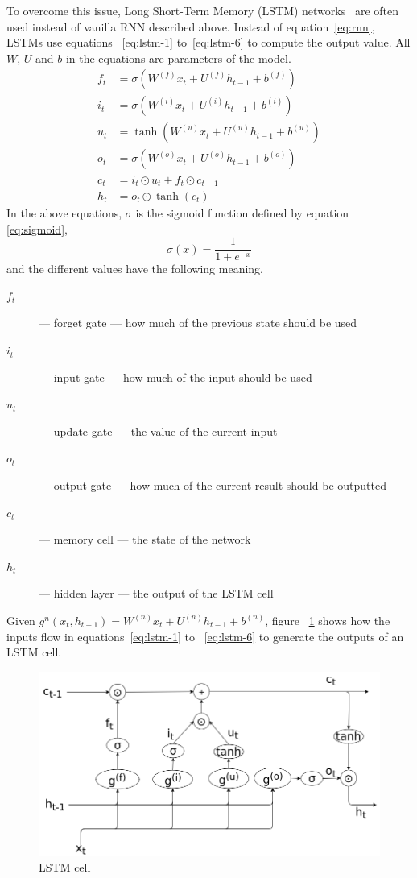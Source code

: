 To overcome this issue, Long Short-Term Memory (LSTM) networks~%
\cite{Hochreiter:1997:LSM:1246443.1246450} are often used instead of vanilla RNN
described above. Instead of equation~\ref{eq:rnn}, LSTMs use equations~%
\ref{eq:lstm-1} to~\ref{eq:lstm-6} to compute the output value. All $W$, $U$ and
$b$ in the equations are parameters of the model.
\begin{align}
  f_t &= \sigma \left( W^{(f)}x_t + U^{(f)}h_{t - 1} + b^{(f)} \right) \label{eq:lstm-1}\\
  i_t &= \sigma \left( W^{(i)}x_t + U^{(i)}h_{t - 1} + b^{(i)} \right)\\
  u_t &= \tanh \left( W^{(u)}x_t + U^{(u)}h_{t - 1} + b^{(u)} \right)\\
  o_t &= \sigma \left( W^{(o)}x_t + U^{(o)}h_{t - 1} + b^{(o)} \right)\\
  c_t &= i_t \odot u_t + f_t \odot c_{t - 1}\\
  h_t &= o_t \odot \tanh(c_t) \label{eq:lstm-6}
\end{align}
In the above equations, $\sigma$ is the sigmoid function defined by equation
\ref{eq:sigmoid},
\begin{equation}
  \label{eq:sigmoid}
  \sigma(x) = \frac{1}{1 + e^{-x}}
\end{equation}
and the different values have the following meaning.
\begin{description}
\item[$f_t$] --- forget gate --- how much of the previous state should be used
\item[$i_t$] --- input gate --- how much of the input should be used
\item[$u_t$] --- update gate --- the value of the current input
\item[$o_t$] --- output gate --- how much of the current result should be outputted
\item[$c_t$] --- memory cell --- the state of the network
\item[$h_t$] --- hidden layer --- the output of the LSTM cell
\end{description}
Given $g^n(x_t, h_{t-1}) = W^{(n)}x_t + U^{(n)} h_{t-1} + b^{(n)}$, figure~%
\ref{fig:lstm-cell} shows how the inputs flow in equations~\ref{eq:lstm-1} to~%
\ref{eq:lstm-6} to generate the outputs of an LSTM cell.
\begin{figure}[tb]
  \begin{center}
    \includegraphics[width=14cm]{./images/lstm-cell.png}
    \caption{\label{fig:lstm-cell}LSTM cell}
  \end{center}
\end{figure}
